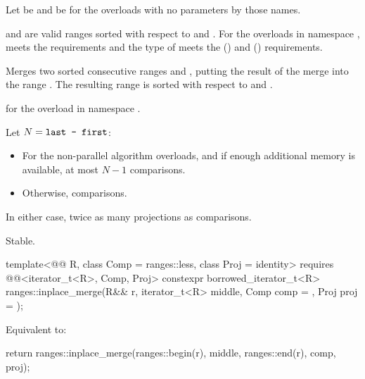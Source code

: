 \begin{itemdescr}
\pnum
Let  be 
and  be 
for the overloads with no parameters by those names.

\pnum
\expects
{} and  are valid ranges
sorted with respect to  and .
For the overloads in namespace ,
 meets
the  requirements and
the type of  meets
the  () and
 () requirements.

\pnum
\effects
Merges two sorted consecutive ranges
 and ,
putting the result of the merge into the range .
The resulting range is sorted with respect to  and .

\pnum
\returns
{} for the overload in namespace .

\pnum
\complexity
Let $N = \tcode{last - first}$:
\begin{itemize}
\item
  For the non-parallel algorithm overloads, and
  if enough additional memory is available, at most $N - 1$ comparisons.
\item
  Otherwise,  comparisons.
\end{itemize}
In either case, twice as many projections as comparisons.

\pnum
\remarks
Stable.
\end{itemdescr}

\begin{itemdecl}
template<@@ R, class Comp = ranges::less, class Proj = identity>
  requires @@<iterator_t<R>, Comp, Proj>
  constexpr borrowed_iterator_t<R>
    ranges::inplace_merge(R&& r, iterator_t<R> middle, Comp comp = {}, Proj proj = {});
\end{itemdecl}

\begin{itemdescr}
\pnum
\effects
Equivalent to:
\begin{codeblock}
return ranges::inplace_merge(ranges::begin(r), middle, ranges::end(r), comp, proj);
\end{codeblock}
\end{itemdescr}

